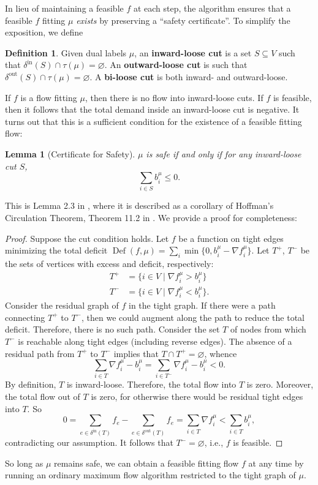 \documentclass[11pt]{article}
\newtheorem{lemma}[theorem]{Lemma}
\theoremstyle{definition}
\newtheorem{definition}{Definition}[section]
\theoremstyle{definition}
\newcommand{\fu}{f^{\mu}}
\newcommand{\nfiu}{\nabla \fu_i}
\newcommand{\biu}{b_{i}^{\mu}}
\newcommand{\din}{\delta^{\text{in}}}
\newcommand{\dout}{\delta^{\text{out}}}
\DeclareMathOperator{\Def}{Def}
\begin{document}
	In lieu of maintaining a feasible $f$ at each step,
	the algorithm ensures that a feasible $f$ fitting $\mu$ \textit{exists} by preserving a
	``safety certificate''. To simplify the exposition, we define 
	\begin{definition}
		Given dual labels $\mu$, an \textbf{inward-loose cut} is a set $S \subseteq V$ such that
		$\din(S) \cap \tau(\mu) = \varnothing$. An \textbf{outward-loose cut}
		is such that $\dout(S) \cap \tau(\mu) = \varnothing$. A \textbf{bi-loose cut}
		is both inward- and outward-loose.
	\end{definition}
	If $f$ is a flow fitting $\mu$, then there is no flow into inward-loose cuts.
	If $f$ is feasible, then it follows that the total demand inside an inward-loose
	cut is negative. It turns out that this is a sufficient condition for the existence
	of a feasible fitting flow:
	\begin{lemma}[Certificate for Safety] \label{lem.safety}
	$\mu$ is safe if and only if for any inward-loose cut $S$,
	\[ \sum_{i \in S} \biu \leq 0. \]
	\end{lemma}
	This is Lemma 2.3 in \cite{Olver2017}, where it is described as a corollary of Hoffman's Circulation
	Theorem, Theorem 11.2 in \cite{Schrijver2002}. We provide a proof for completeness:
	\begin{proof}
		Suppose the cut condition holds. Let $f$ be a function on tight edges minimizing
		the total deficit $\Def(f, \mu) = \sum_i \min\{0, \biu - \nfiu\}$. Let
		$T^+$, $T^-$ be the sets of vertices with excess and deficit, respectively:
		\begin{align*}
			T^+ &= \{i \in V \mid \nfiu > \biu \} \\
			T^- &= \{i \in V \mid \nfiu < \biu \}.
		\end{align*}
		Consider the residual graph of $f$ in the tight graph. If there were a path
		connecting $T^+$ to $T^-$, then we could augment along the path
		to reduce the total deficit. Therefore, there is no such path. Consider the
		set $T$ of nodes from which $T^-$ is reachable along tight edges (including reverse edges).
		The absence of a residual path from $T^+$ to $T^-$
        implies that $T \cap T^+ = \varnothing$, whence
		\[ \sum_{i \in T} \nfiu - \biu = \sum_{i \in T^-} \nfiu - \biu < 0. \]
		By definition, $T$ is inward-loose. Therefore, the total flow into $T$ is zero.
        Moreover, the total flow out of $T$ is zero, for otherwise there would be
        residual tight edges into $T$. So
		\[ 0 = \sum_{e \in \din(T)} f_e - \sum_{e \in \dout(T)} f_e
		     = \sum_{i \in T} \nfiu < \sum_{i \in T} \biu, \]
		contradicting our assumption. It follows that $T^- = \varnothing$, i.e., $f$
		is feasible.
	\end{proof}
    So long as $\mu$ remains safe, we can obtain a feasible fitting flow $f$ at any time
    by running an ordinary maximum flow algorithm restricted to the tight graph of $\mu$.
    
\end{document}
